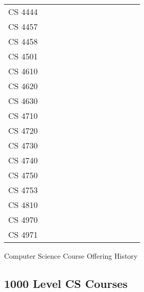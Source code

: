 \documentclass[10pt,letter,twocolumn]{book}
\begin{document}
{\begin{tabular}{l|cccccccccccc}
CS 4444 & \X &    & \X &    & \X &    & \X &    &    & \X &    \\
CS 4457 & \X & \X & \X & \X & \X & \X & \X & \X & \X & \X & \X \\
CS 4458 & \X &    &    &    &    &    &    &    &    &    &    \\
CS 4501 &    &    &    &    & \X & \X &    &    & \X & \X &    \\
CS 4610 &    &    & \X &    &    &    &    & \X &    &    &    \\
CS 4620 &    &    &    &    &    &    &    &    &    &    & \X \\
CS 4630 &    & \X & \X & \X &    & \X &    & \X &    & \X & \X \\
CS 4710 &    & \X &    &    &    & \X &    & \X &    & \X &    \\
CS 4720 &    &    & \X &    & \X &    & \X &    & \X &    & \X \\
CS 4730 &    &    &    & \X &    &    & \X &    &    &    &    \\
CS 4740 &    &    &    &    &    &    &    & \X &    & \X &    \\
CS 4750 & \X &    &    & \X &    & \X &    & \X &    & \X & \X \\
CS 4753 & \X &    & \X &    & \X &    & \X &    & \X &    & \X \\
CS 4810 & \X &    &    & \X &    &    & \X &    & \X &    &    \\
CS 4970 &    &    &    &    &    &    &    & \X & \X &    & \X \\
CS 4971 &    &    &    &    &    &    &    &    &    & \X &    \\
\end{tabular}
}

\begin{table}[h!]
\begin{center}

{\resizebox{3.625in}{!}{\courseofferingtable}}
{\courseofferingtable}

\caption{Computer Science Course Offering History}
\end{center}
\end{table}

\subsection{1000 Level CS Courses}
\end{document}
